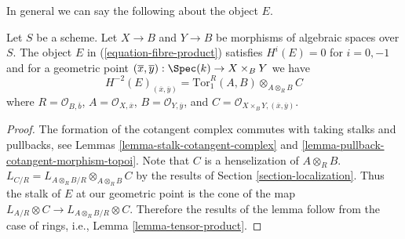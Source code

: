 \noindent
In general we can say the following about the object $E$.

\begin{lemma}
\label{lemma-fibre-product}
Let $S$ be a scheme. Let $X \to B$ and $Y \to B$ be morphisms of algebraic
spaces over $S$. The object $E$ in (\ref{equation-fibre-product}) satisfies
$H^i(E) = 0$ for $i = 0, -1$ and for a geometric point
$(\overline{x}, \overline{y}) : \Spec(k) \to X \times_B Y$ we have
$$
H^{-2}(E)_{(\overline{x}, \overline{y})} =
\text{Tor}_1^R(A, B) \otimes_{A \otimes_R B} C
$$
where $R = \mathcal{O}_{B, \overline{b}}$, $A = \mathcal{O}_{X, \overline{x}}$,
$B = \mathcal{O}_{Y, \overline{y}}$, and
$C = \mathcal{O}_{X \times_B Y, (\overline{x}, \overline{y})}$.
\end{lemma}

\begin{proof}
The formation of the cotangent complex commutes with taking stalks
and pullbacks, see
Lemmas \ref{lemma-stalk-cotangent-complex} and
\ref{lemma-pullback-cotangent-morphism-topoi}.
Note that $C$ is a henselization of $A \otimes_R B$.
$L_{C/R} = L_{A \otimes_R B/R} \otimes_{A \otimes_R B} C$
by the results of Section \ref{section-localization}.
Thus the stalk of $E$ at our geometric point is the cone of the
map $L_{A/R} \otimes C \to L_{A \otimes_R B/R} \otimes C$.
Therefore the results of the lemma follow from
the case of rings, i.e., Lemma \ref{lemma-tensor-product}.
\end{proof}














